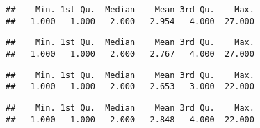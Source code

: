 \documentclass[
]{article}
\newenvironment{Shaded}{\begin{snugshade}}{\end{snugshade}}
\newcommand{\DecValTok}[1]{\textcolor[rgb]{0.00,0.00,0.81}{#1}}
\newcommand{\KeywordTok}[1]{\textcolor[rgb]{0.13,0.29,0.53}{\textbf{#1}}}
\newcommand{\NormalTok}[1]{#1}
\newcommand{\OperatorTok}[1]{\textcolor[rgb]{0.81,0.36,0.00}{\textbf{#1}}}
\newcommand{\StringTok}[1]{\textcolor[rgb]{0.31,0.60,0.02}{#1}}
\begin{document}
\begin{verbatim}
##    Min. 1st Qu.  Median    Mean 3rd Qu.    Max. 
##   1.000   1.000   2.000   2.954   4.000  27.000
\end{verbatim}

\begin{Shaded}
\end{Shaded}

\begin{verbatim}
##    Min. 1st Qu.  Median    Mean 3rd Qu.    Max. 
##   1.000   1.000   2.000   2.767   4.000  27.000
\end{verbatim}

\begin{Shaded}
\end{Shaded}

\begin{verbatim}
##    Min. 1st Qu.  Median    Mean 3rd Qu.    Max. 
##   1.000   1.000   2.000   2.653   3.000  22.000
\end{verbatim}

\begin{Shaded}
\end{Shaded}

\begin{verbatim}
##    Min. 1st Qu.  Median    Mean 3rd Qu.    Max. 
##   1.000   1.000   2.000   2.848   4.000  22.000
\end{verbatim}
\end{document}
